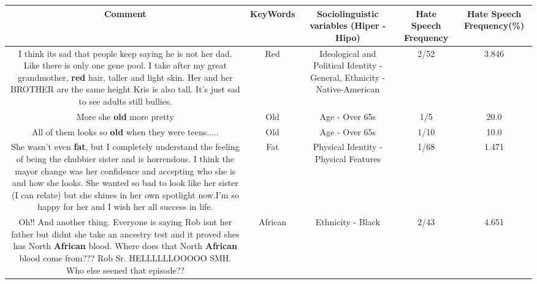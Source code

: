 \documentclass[11pt]{article}
\newlength\mylength
\begin{document}
\begin{center}
\setlength\mylength{\dimexpr\textwidth - 1\arrayrulewidth - 50\tabcolsep}
\begin{longtable}{|C{.65\mylength}|C{.30\mylength}|C{.12\mylength}|C{.12\mylength}|C{.12\mylength}|}
\hline
\textbf{Comment} & \textbf{KeyWords} & \textbf{Sociolinguistic variables (Hiper - Hipo)}  & \textbf{Hate Speech Frequency} & \textbf{Hate Speech Frequency(\%)} \\
\hline{}\small I think its sad that people keep saying he is not her dad. Like there is only one gene pool. I take after my great grandmother, \textbf{r\textbf{ed}} hair, taller and light skin. Her and her BROTHER are the same height Kris is also tall. It's just sad to see adults still bullies.\normalsize   & Red &  Ideological and Political Identity - General, Ethnicity - Native-American & 2/52 & 3.846 \\  \hline
  \small More she \textbf{old} more pretty\normalsize   & Old & Age - Over 65s & 1/5 & 20.0 \\  \hline
  \small All of them looks so \textbf{old} when they were teens.....\normalsize   & Old & Age - Over 65s & 1/10 & 10.0 \\  \hline
  \small She wasn't even \textbf{fat}, but I completely understand the feeling of being the chubbier sister and is horrendous. I think the mayor change was her confidence and accepting who she is and how she looks. She wanted so bad to look like her sister (I can relate) but she shines in her own spotlight now.I'm so happy for her and I wish her all success in life.\normalsize   & Fat & Physical Identity - Physical Features & 1/68 & 1.471 \\  \hline
  \small Oh!! And another thing. Everyone is saying Rob isnt her father but didnt she take an ancestry test and it proved shes has North \textbf{African} blood. Where does that North \textbf{African} blood come from??? Rob Sr. HELLLLLLOOOOO SMH. Who else seened that episode??\normalsize   & African & Ethnicity - Black & 2/43 & 4.651 \\  \hline

\end{longtable}
\end{center}
\end{document}
